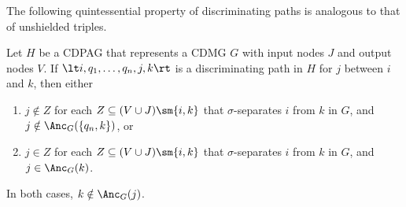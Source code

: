 The following quintessential property of discriminating paths is analogous to that of unshielded triples. 
\begin{Prp}\label{prp:orienting_discriminating_paths}
  Let $H$ be a CDPAG that represents a CDMG $G$ with input nodes $J$ and output nodes $V$.
  If $\lt i, q_1, \dots, q_n, j, k \rt$ is a discriminating path in $H$ for $j$ between $i$ and $k$, then
  either 
  \begin{enumerate}[label=(\roman*)]
    \item $j \notin Z$ for each $Z \subseteq (V \cup J) \sm \{i,k\}$ that $\sigma$-separates $i$ from $k$ in $G$, and $j \notin \Anc_G(\{q_n,k\})$, or
    \item $j \in Z$ for each $Z \subseteq (V \cup J) \sm \{i,k\}$ that $\sigma$-separates $i$ from $k$ in $G$, and $j \in \Anc_G(k)$.
  \end{enumerate}
  In both cases, $k \notin \Anc_G(j)$.
\end{Prp}
